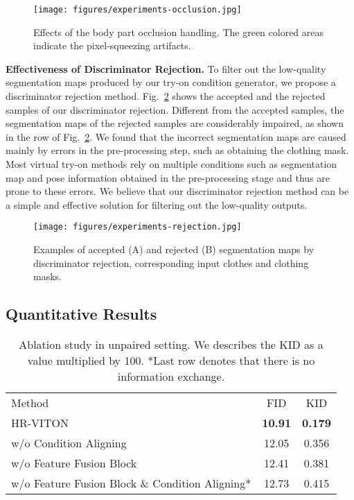 \begin{figure}[t!]
    \centering
    \texttt{[image: figures/experiments-occlusion.jpg]}
    \caption{Effects of the body part occlusion handling. The green colored areas indicate the pixel-squeezing artifacts.}
    \label{fig:occlusion}
    \vspace{0.5cm}
\end{figure}


\noindent\textbf{Effectiveness of Discriminator Rejection.}
To filter out the low-quality segmentation maps produced by our try-on condition generator, we propose a discriminator rejection method.
Fig.~\ref{fig:rejection} shows the accepted and the rejected samples of our discriminator rejection.
Different from the accepted samples, the segmentation maps of the rejected samples are considerably impaired, as shown in the  row of Fig.~\ref{fig:rejection}.
We found that the incorrect segmentation maps are caused mainly by errors in the pre-processing step, such as obtaining the clothing mask.
Most virtual try-on methods rely on multiple conditions such as segmentation map and pose information obtained in the pre-processing stage and thus are prone to these errors.
We believe that our discriminator rejection method can be a simple and effective solution for filtering out the low-quality outputs.





\begin{figure}[t!]
    \texttt{[image: figures/experiments-rejection.jpg]}
    \caption{Examples of accepted (A) and rejected (B) segmentation maps by discriminator rejection, corresponding input clothes and clothing masks.}
    \label{fig:rejection}
\end{figure}


\subsection{Quantitative Results}
\begin{table}[b!]
    \centering
    \footnotesize
    \begin{tabular}{l|cc}
    \toprule
    Method & FID & KID  \\ 
    \cmidrule(lr){1-3}
    HR-VITON & \textbf{10.91} & \textbf{0.179} \\ 
     w/o Condition Aligning                     & 12.05 & 0.356 \\
     w/o Feature Fusion Block                        & 12.41 & 0.381 \\
     w/o Feature Fusion Block \& Condition Aligning*     & 12.73 & 0.415 \\
    \bottomrule
    \end{tabular}
    \caption{Ablation study in unpaired setting. We describes the KID as a value multiplied by 100. *Last row denotes that there is no information exchange.}
    
    \label{table:ablation}
\end{table}


